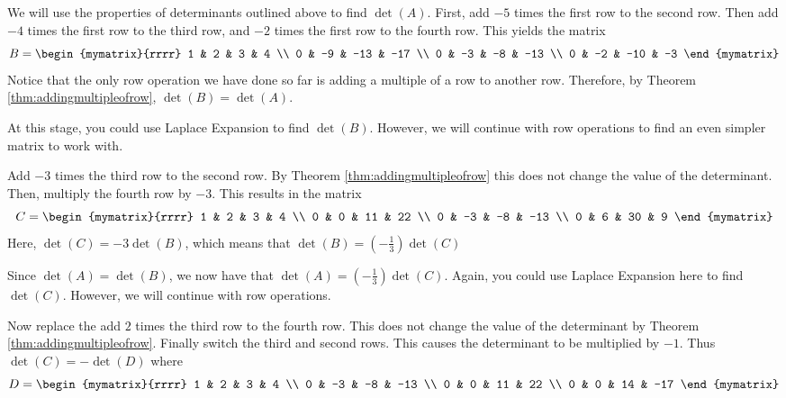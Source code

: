 \begin{solution}
We will use the properties of determinants outlined above to find $\det \left(A\right)$. First, add $-5$ times the first row to the second row. Then add $-4$ times the first row to the third row, and $-2$ times
the first row to the fourth row. This yields the matrix
\begin{equation*}
B=\begin{mymatrix}{rrrr}
1 & 2 & 3 & 4 \\
0 & -9 & -13 & -17 \\
0 & -3 & -8 & -13 \\
0 & -2 & -10 & -3
\end{mymatrix}
\end{equation*}
Notice that the only row operation we have done so far is adding a multiple 
of a row to another row. Therefore, by Theorem \ref{thm:addingmultipleofrow}, $\det \left(B\right) = \det \left(A\right).$ 

At this stage, you could use Laplace Expansion to find $\det \left(B\right)$. However, we will continue with row operations 
to find an even simpler matrix to work with.

Add $-3$ times the third row to the second row. By Theorem \ref{thm:addingmultipleofrow} this does not change the value of
the determinant. Then, multiply the fourth row by $-3$. This results in the matrix
\begin{equation*}
C=\begin{mymatrix}{rrrr}
1 & 2 & 3 & 4 \\
0 & 0 & 11 & 22 \\
0 & -3 & -8 & -13 \\
0 & 6 & 30 & 9
\end{mymatrix} 
\end{equation*}
Here, $\det \left(C\right) = -3 \det \left(B\right)$, which means that 
$\det \left( B\right) =\left(-\frac{1}{3}\right) \det \left( C\right) $

Since $\det \left(A\right) = \det \left(B\right)$, we now have that 
$\det \left(A\right) = \left(-\frac{1}{3}\right) \det \left( C\right)$. Again, you could use Laplace Expansion here to find $\det \left(C\right)$. However,
we will continue with row operations.

Now replace the add $2$ times the third row to the fourth row. This does not change the
value of the determinant by Theorem \ref{thm:addingmultipleofrow}. Finally switch the third
and second rows. This causes the determinant to be multiplied by $-1.$ Thus $\det \left( C\right) = -\det \left( D\right) $ where
\begin{equation*}
D=\begin{mymatrix}{rrrr}
1 & 2 & 3 & 4 \\
0 & -3 & -8 & -13 \\
0 & 0 & 11 & 22 \\
0 & 0 & 14 & -17
\end{mymatrix}
\end{equation*}


\end{solution}
